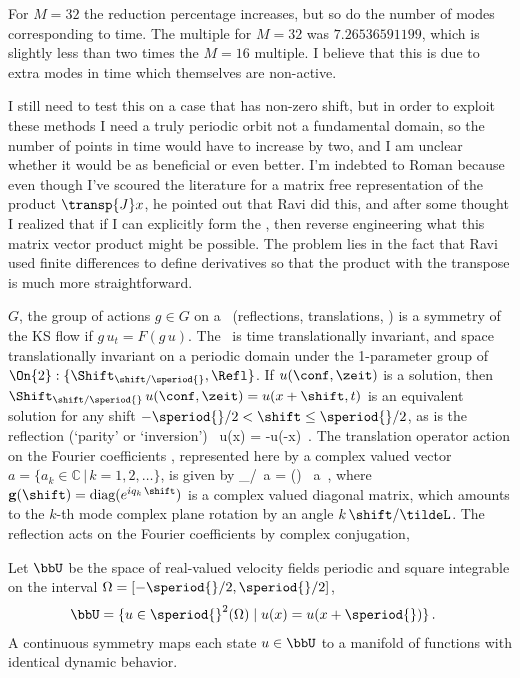 For $M=32$ the reduction percentage increases, but so do the number of modes corresponding to time. The multiple for
$M=32$ was $7.26536591199$,  which is slightly less than two times the $M=16$ multiple. I believe that this is due
to extra modes in time which themselves are non-active.

I still need to test this on a case that has non-zero shift, but in order to exploit these methods I need a truly periodic
orbit not a fundamental domain, so the number of points in time would have to increase by two, and I am unclear whether
it would be as beneficial or even better.
I'm indebted to Roman because even though I've scoured the literature for a
matrix free representation of the product $\transp{J} x$, he pointed out that
Ravi did this, and after some thought I realized that if I can explicitly
form the \jacobianM, then reverse engineering what this matrix vector product
might be possible. The problem lies in the fact that Ravi used finite
differences to define derivatives so that the product with the transpose is
much more straightforward.

$G$, the group of actions $ g \in G $ on a
\statesp\ (reflections, translations, \etc) is a symmetry of the KS
flow  if $g\,u_t = F(g\,u)$.
The \KSe\ is time translationally invariant, and space translationally invariant
on a periodic domain under
the 1-parameter group of
$\On{2}: \{\Shift_{\shift/\speriod{}},\Refl \}$.
If $u(\conf,\zeit)$ is a solution, then
$\Shift_{\shift/\speriod{}}\, u(\conf,\zeit) = u(x+\shift,t)$
is an equivalent solution for any shift
$-\speriod{}/2 < \shift \leq \speriod{}/2$,
as is the
reflection (`parity' or `inversion')
\beq
    \Refl \, u(x) = -u(-x)
\,.
The translation operator action on the Fourier coefficients ,
represented here by a complex valued vector
$a = \{a_k\in\mathbb{C}\,|\,k = 1, 2, \ldots\}$, is given by
\beq
  \Shift_{\shift/\speriod{}}\, a = (\shift) \, a \,,
  \label{eq:shiftFour}
\eeq
where $\mathbf{g}(\shift) = \mbox{diag}( e^{i q_k\, \shift} )$ is a complex
valued diagonal matrix, which amounts to the $k$-th mode complex plane
rotation by an angle $k\, \shift /\tildeL$.  The reflection acts on
the Fourier coefficients by complex conjugation,


  Let $\bbU$ be the space of
real-valued velocity fields periodic and square integrable
on the interval $\Omega = [-\speriod{}/2,\speriod{}/2]$,
\begin{align}
 \bbU  &= \{u \in \speriod{}^2(\Omega) \; | \; u(x) = u(x+\speriod{})\}  \,.
\end{align}
A continuous symmetry maps each state $u \in \bbU$
to a manifold of functions with identical dynamic behavior.

